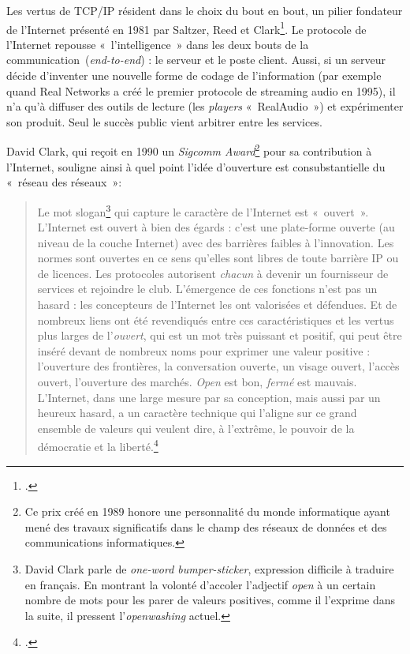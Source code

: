 \documentclass{FramateX}
\begin{document}
\begin{refsection}
Les vertus de TCP/IP résident dans le choix du bout en bout, un pilier
fondateur de l'Internet présenté en 1981 par Saltzer,
Reed et Clark\footnote{\cite{saltzerend--end1981}.}. Le
protocole de l'Internet repousse
«~l'intelligence~» dans les deux bouts de la
communication~(\textit{end-to-end}) : le serveur et le poste client.
Aussi, si un serveur décide d'inventer une nouvelle
forme de codage de l'information (par exemple quand Real Networks a créé le premier protocole de streaming audio
en 1995), il n'a qu'à diffuser des
outils de lecture (les \textit{players} «~RealAudio~») et expérimenter
son produit. Seul le succès public vient arbitrer entre les services. 

David Clark, qui reçoit en 1990 un \textit{Sigcomm Award}\footnote{Ce
prix créé en 1989 honore une personnalité du monde informatique ayant
mené des travaux significatifs dans le champ des réseaux de données et
des communications informatiques.} pour sa contribution à
l'Internet, souligne ainsi à quel point
l'idée d'ouverture est
consubstantielle du «~réseau des réseaux~»:

\begin{quote}
Le mot slogan\footnote{David Clark parle de \textit{one-word
bumper-sticker}, expression difficile à traduire en français. En
montrant la volonté d'accoler
l'adjectif \textit{open} à un certain nombre de mots pour
les parer de valeurs positives, comme il l'exprime
dans la suite, il pressent l'\textit{openwashing} actuel. }
qui capture le caractère de l'Internet est
«~ouvert~».
L'Internet est ouvert à bien des égards :
c'est une plate-forme ouverte (au niveau de la couche
Internet) avec des barrières faibles à l'innovation.
Les normes sont ouvertes en ce sens qu'elles sont
libres de toute barrière IP ou de licences. Les protocoles autorisent
\textit{chacun} à devenir un fournisseur de services et rejoindre le club.
L'émergence de ces fonctions n'est
pas un hasard : les concepteurs de l'Internet les ont
valorisées et défendues. Et de nombreux liens ont été revendiqués entre
ces caractéristiques et les vertus plus larges de
l'\textit{ouvert}, qui est un mot très puissant et
positif, qui peut être inséré devant de nombreux noms pour exprimer une
valeur positive : l'ouverture des frontières, la
conversation ouverte, un visage ouvert, l'accès
ouvert, l'ouverture des marchés. \textit{Open} est bon,
\textit{fermé} est mauvais. L'Internet, dans une large
mesure par sa conception, mais aussi par un heureux hasard, a un
caractère technique qui l'aligne sur ce grand ensemble
de valeurs qui veulent dire, à l'extrême, le pouvoir
de la démocratie et la liberté.\footnote{\cite{clarknetwork2007}.}
\end{quote}



\end{refsection}
\end{document}
